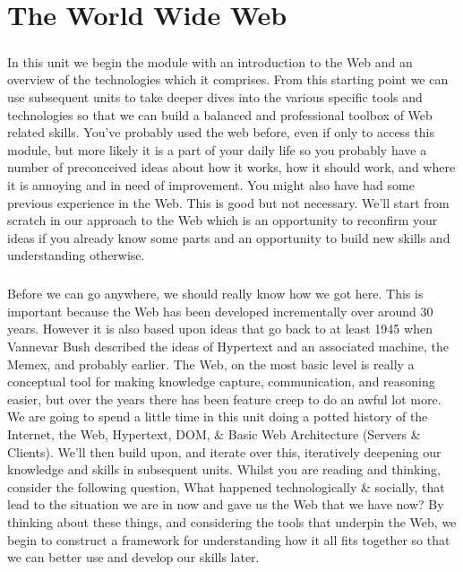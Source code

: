 \chapter{The World Wide Web}
\label{www}
\paragraph{} In this unit we begin the module with an introduction to the Web and an overview of the technologies which it comprises. From this starting point we can use subsequent units to take deeper dives into the various specific tools and technologies so that we can build a balanced and professional toolbox of Web related skills. You've probably used the web before, even if only to access this module, but more likely it is a part of your daily life so you probably have a number of preconceived ideas about how it works, how it should work, and where it is annoying and in need of improvement. You might also have had some previous experience in the Web. This is good but not necessary. We'll start from scratch in our approach to the Web which is an opportunity to reconfirm your ideas if you already know some parts and an opportunity to build new skills and understanding otherwise. 
 
\paragraph{} Before we can go anywhere, we should really know how we got here. This is important because the Web has been developed incrementally over around 30 years. However it is also based upon ideas that go back to at least 1945 when Vannevar Bush described the ideas of Hypertext and an associated machine, the Memex, and probably earlier. The Web, on the most basic level is really a conceptual tool for making knowledge capture, communication, and reasoning easier, but over the years there has been feature creep to do an awful lot more.
We are going to spend a little time in this unit doing a potted history of the Internet, the Web, Hypertext, DOM, \& Basic Web Architecture (Servers \& Clients). We'll then build upon, and iterate over this, iteratively deepening our knowledge and skills in subsequent units.
Whilst you are reading and thinking, consider the following question, What happened technologically \& socially, that lead to the situation we are in now and gave us the Web that we have now? 
By thinking about these things, and considering the tools that underpin the Web, we begin to construct a framework for understanding how it all fits together so that we can better use and develop our skills later.
 
